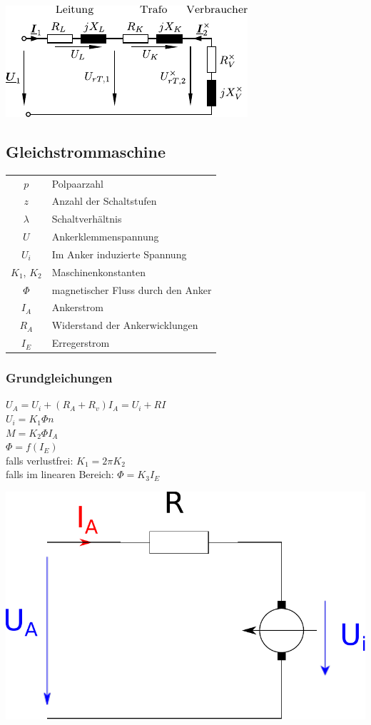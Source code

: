 \documentclass[european]{latex4ei_sheet}
\begin{document}
		
		\includegraphics{./img/LeitungTrafo.pdf}
	
		\subsection{Gleichstrommaschine}
		
		\begin{tabular}{cl}
		$p$ & Polpaarzahl \\
		$z$ & Anzahl der Schaltstufen \\
		$\lambda$ & Schaltverhältnis \\
		$U$ & Ankerklemmenspannung \\
		$U_i$ & Im Anker induzierte Spannung \\
		$K_1$, $K_2$ & Maschinenkonstanten \\
		$\Phi$ & magnetischer Fluss durch den Anker \\
		$I_A$ & Ankerstrom \\
		$R_A$ & Widerstand der Ankerwicklungen \\
		$I_E$ & Erregerstrom
		\end{tabular}
		
		\subsubsection{Grundgleichungen}
		$U_A = U_i + (R_A + R_v) I_A = U_i + RI$\\
		$U_i = K_1 \Phi n$\\
		$M = K_2 \Phi I_A$\\
		$\Phi = f(I_E)$\\
		falls verlustfrei: $K_1 = 2 \pi K_2$ \\
		falls im linearen Bereich: $\Phi = K_3 I_E$ \\
		
		\begin{center}
		\includegraphics[scale=.2]{./img/ersatzschaltbild_gleichstrommaschine.pdf}
		\end{center}
		
\end{document}
